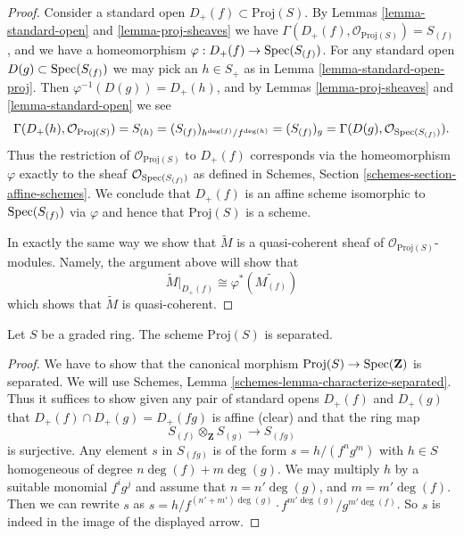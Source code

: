 \begin{proof}
Consider a standard open $D_{+}(f) \subset \text{Proj}(S)$.
By Lemmas \ref{lemma-standard-open} and \ref{lemma-proj-sheaves}
we have $\Gamma(D_{+}(f), \mathcal{O}_{\text{Proj}(S)}) = S_{(f)}$, and
we have a homeomorphism $\varphi : D_{+}(f) \to \mathop{\mathrm{Spec}}(S_{(f)})$.
For any standard open $D(g) \subset \mathop{\mathrm{Spec}}(S_{(f)})$ we may
pick an $h \in S_{+}$ as in Lemma \ref{lemma-standard-open-proj}.
Then $\varphi^{-1}(D(g)) = D_{+}(h)$, and by
Lemmas \ref{lemma-proj-sheaves} and \ref{lemma-standard-open} we see
$$
\Gamma(D_{+}(h), \mathcal{O}_{\text{Proj}(S)})
=
S_{(h)}
=
(S_{(f)})_{h^{\deg(f)}/f^{\deg(h)}}
=
(S_{(f)})_g
=
\Gamma(D(g), \mathcal{O}_{\mathop{\mathrm{Spec}}(S_{(f)})}).
$$
Thus the restriction of $\mathcal{O}_{\text{Proj}(S)}$ to
$D_{+}(f)$ corresponds via the homeomorphism $\varphi$
exactly to the sheaf $\mathcal{O}_{\mathop{\mathrm{Spec}}(S_{(f)})}$
as defined in Schemes, Section \ref{schemes-section-affine-schemes}.
We conclude that $D_{+}(f)$ is an affine scheme isomorphic to
$\mathop{\mathrm{Spec}}(S_{(f)})$ via $\varphi$ and
hence that $\text{Proj}(S)$ is a scheme.

\medskip\noindent
In exactly the same way we show that $\widetilde M$ is a
quasi-coherent sheaf of $\mathcal{O}_{\text{Proj}(S)}$-modules.
Namely, the argument above will show that
$$
\widetilde M|_{D_{+}(f)} \cong \varphi^*\left(\widetilde{M_{(f)}}\right)
$$
which shows that $\widetilde M$ is quasi-coherent.
\end{proof}

\begin{lemma}
\label{lemma-proj-separated}
Let $S$ be a graded ring.
The scheme $\text{Proj}(S)$ is separated.
\end{lemma}

\begin{proof}
We have to show that the canonical morphism
$\text{Proj}(S) \to \mathop{\mathrm{Spec}}(\mathbf{Z})$
is separated.
We will use Schemes, Lemma \ref{schemes-lemma-characterize-separated}.
Thus it suffices to show given any pair of standard opens
$D_{+}(f)$ and $D_{+}(g)$ that $D_{+}(f) \cap D_{+}(g) = D_{+}(fg)$
is affine (clear) and that the ring map
$$
S_{(f)} \otimes_{\mathbf{Z}} S_{(g)} \longrightarrow S_{(fg)}
$$
is surjective. Any element $s$ in $S_{(fg)}$ is of
the form $s = h/(f^ng^m)$ with $h \in S$ homogeneous of degree
$n\deg(f) + m\deg(g)$. We may multiply $h$ by a suitable
monomial $f^ig^j$ and assume that $n = n' \deg(g)$, and
$m = m' \deg(f)$. Then we can rewrite $s$ as
$s = h/f^{(n' + m')\deg(g)} \cdot f^{m'\deg(g)}/g^{m'\deg(f)}$.
So $s$ is indeed in the image of the displayed arrow.
\end{proof}

